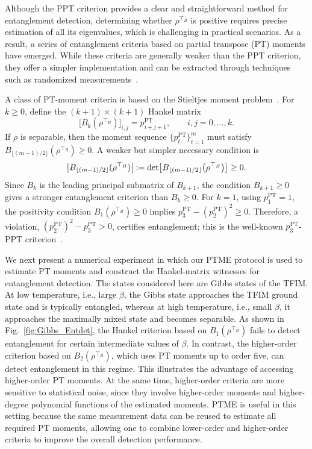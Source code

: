 \documentclass[aps,prl,twocolumn,nofootinbib,superscriptaddress,10pt]{revtex4-2}
\let\originalleft\left
\let\originalright\right
\renewcommand{\left}{\mathopen{}\mathclose\bgroup\originalleft}
\renewcommand{\right}{\aftergroup\egroup\originalright}
\theoremstyle{plain}
\theoremstyle{definition}
\newcommand{\PT}{\mathrm{PT}}
\begin{document}
Although the PPT criterion provides a clear and straightforward method for entanglement detection, determining whether $\rho^{\top_B}$ is positive requires precise estimation of all its eigenvalues, which is challenging in practical scenarios. 
As a result, a series of entanglement criteria based on partial transpose (PT) moments have emerged. 
While these criteria are generally weaker than the PPT criterion, they offer a simpler implementation and can be extracted through techniques such as randomized measurements~\cite{elben2020mixedstate,singlezhou,PhysRevX.14.031035,PhysRevLett.121.150503,PhysRevLett.94.040502,PhysRevA.99.062309}.


A class of PT-moment criteria is based on the Stieltjes moment problem~\cite{Yu2021Entanglement}. 
For \(k\ge0\), define the \((k+1)\times(k+1)\) Hankel matrix
\begin{equation}
\big[B_k(\rho^{\top_B})\big]_{i,j}
=
p^{\PT}_{i+j+1},
\qquad i,j=0,\ldots,k .
\end{equation}
If \(\rho\) is separable, then the moment sequence \(\{p_t^{\PT}\}_{t=1}^m\) must satisfy
$B_{\lfloor (m-1)/2 \rfloor}(\rho^{\top_B})\geq0$. 
A weaker but simpler necessary condition is
\begin{equation}
\left|B_{\lfloor (m-1)/2 \rfloor}(\rho^{\top_B})\right| := \det\left[B_{\lfloor (m-1)/2 \rfloor}\left(\rho^{\top_B}\right)\right] \geq 0 .
\end{equation}
Since \(B_k\) is the leading principal submatrix of \(B_{k+1}\), the condition \(B_{k+1}\geq0\) gives a stronger entanglement criterion than \(B_k\geq0\). 
For \(k=1\), using \(p_1^{\PT}=1\), the positivity condition \(B_1(\rho^{\top_B})\geq0\) implies
$p_3^{\PT}-(p_2^{\PT})^2\ge0$.
Therefore, a violation,
$(p_2^{\PT})^2-p_3^{\PT}>0$,
certifies entanglement; this is the well-known \(p_3^{\PT}\)-PPT criterion~\cite{elben2020mixedstate}.



We next present a numerical experiment in which our PTME protocol is used to estimate PT moments and construct the Hankel-matrix witnesses for entanglement detection. 
The states considered here are Gibbs states of the TFIM. 
At low temperature, i.e., large \(\beta\), the Gibbs state approaches the TFIM ground state and is typically entangled, whereas at high temperature, i.e., small \(\beta\), it approaches the maximally mixed state and becomes separable. 
As shown in Fig.~\ref{fig:Gibbs_Entdet}, the Hankel criterion based on \(B_1(\rho^{\top_B})\) fails to detect entanglement for certain intermediate values of \(\beta\). 
In contrast, the higher-order criterion based on \(B_2(\rho^{\top_B})\), which uses PT moments up to order five, can detect entanglement in this regime. 
This illustrates the advantage of accessing higher-order PT moments. 
At the same time, higher-order criteria are more sensitive to statistical noise, since they involve higher-order moments and higher-degree polynomial functions of the estimated moments. 
PTME is useful in this setting because the same measurement data can be reused to estimate all required PT moments, allowing one to combine lower-order and higher-order criteria to improve the overall detection performance.
\end{document}
